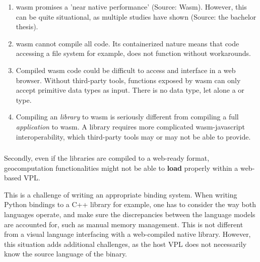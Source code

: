 \begin{enumerate}[-]
  \item \ac{wasm} promises a 'near native performance' (Source: Wasm). However, this can be quite situational, as multiple studies have shown \citep{jangda_not_2019} (Source: the bachelor thesis). 
  \item \ac{wasm} cannot compile all code. Its containerized nature means that code accessing a file system for example, does not function without workarounds. 
  \item Compiled \ac{wasm} code could be difficult to access and interface in a web browser. Without third-party tools, functions exposed by \ac{wasm} can only accept primitive data types as input. There is no  data type, let alone a  or  type. 
  \item Compiling an \emph{library} to \ac{wasm} is seriously different from compiling a full \emph{application} to wasm. A library requires more complicated wasm-javascript interoperability, which third-party tools may or may not be able to provide.
\end{enumerate}

\subsubsection*{\mySubRQThreeTitle}

Secondly, even if the libraries are compiled to a web-ready format, geocomputation functionalities might not be able to \textbf{load} properly within a web-based VPL.

This is a challenge of writing an appropriate binding system. 
When writing Python bindings to a C++ library for example, one has to consider the way both languages operate, and make sure the discrepancies between the language models are accounted for, such as manual memory management. 
This is not different from a visual language interfacing with a web-compiled native library. 
However, this situation adds additional challenges, as the host \ac{VPL} does not necessarily know the source language of the binary. 


\subsubsection*{\mySubRQFourTitle}

